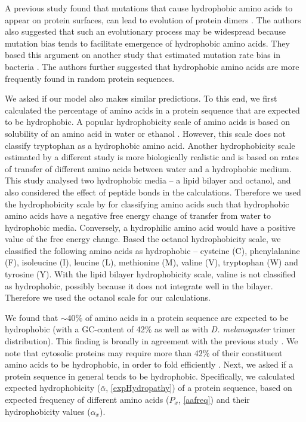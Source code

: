 \documentclass[12pt,a4paper]{article}
\begin{document}
A previous study found that mutations that cause hydrophobic amino acids to appear on protein surfaces, can lead to evolution of protein dimers \citep{hydrophobicRatchet}. The authors also suggested that such an evolutionary process may be widespread because mutation bias tends to facilitate emergence of hydrophobic amino acids. They based this argument on another study that estimated mutation rate bias in bacteria \citep{bacteriaMutbias}. The authors \citep{hydrophobicRatchet} further suggested that hydrophobic amino acids are more frequently found in random protein sequences. 

We asked if our model also makes similar predictions. To this end, we first calculated the percentage of amino acids in a protein sequence that are expected to be hydrophobic. A popular hydrophobicity scale of amino acids is based on solubility of an amino acid in water or ethanol \citep{hydropathy}. However, this scale does not classify tryptophan as a hydrophobic amino acid. Another hydrophobicity scale estimated by a different study \citep{WWhydropathy} is more biologically realistic and is based on rates of transfer of different amino acids between water and a hydrophobic medium. This study analysed two hydrophobic media -- a lipid bilayer and octanol, and also considered the effect of peptide bonds in the calculations. Therefore we used the hydrophobicity scale by \cite{WWhydropathy} for classifying amino acids such that hydrophobic amino acids have a negative free energy change of transfer from water to hydrophobic media. Conversely, a hydrophilic amino acid would have a positive value of the free energy change. Based the octanol hydrophobicity scale, we classified the following amino acids as hydrophobic -- cysteine (C), phenylalanine (F), isoleucine (I), leucine (L), methionine (M), valine (V), tryptophan (W) and tyrosine (Y). With the lipid bilayer hydrophobicity scale, valine is not classified as hydrophobic, possibly because it does not integrate well in the bilayer. Therefore we used the octanol scale for our calculations.

We found that $\sim$40\% of amino acids in a protein sequence are expected to be hydrophobic (with a GC-content of 42\% as well as with \textit{D. melanogaster} trimer distribution). This finding is broadly in agreement with the previous study \citep{hydrophobicRatchet}. We note that cytosolic proteins may require more than 42\% of their constituent amino acids to be hydrophobic, in order to fold efficiently \citep{Dill1985}. Next, we asked if a protein sequence in general tends to be hydrophobic. Specifically, we calculated expected hydrophobicity ($\bar{\alpha}$, \autoref{expHydropathy}) of a protein sequence, based on expected frequency of different amino acids ($P_x$, \autoref{aafreq}) and their hydrophobicity values ($\alpha_x$). 
\end{document}
